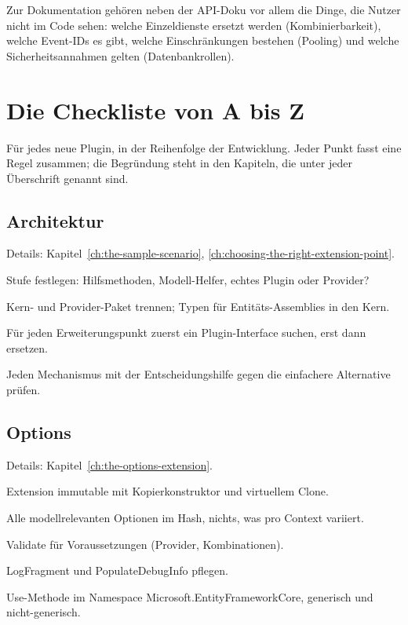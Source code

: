 Zur Dokumentation gehören neben der API-Doku vor allem die Dinge, die Nutzer nicht im Code
sehen: welche Einzeldienste ersetzt werden (Kombinierbarkeit), welche Event-IDs es gibt,
welche Einschränkungen bestehen (Pooling) und welche Sicherheitsannahmen gelten
(Datenbankrollen).

\chapter{Die Checkliste von A bis Z}\label{ch:the-checklist-from-a-to}

Für jedes neue Plugin, in der Reihenfolge der Entwicklung. Jeder Punkt fasst eine Regel zusammen; die Begründung steht in den Kapiteln, die unter jeder Überschrift genannt sind.

\section{Architektur}

\noindent Details: Kapitel~\ref{ch:the-sample-scenario}, \ref{ch:choosing-the-right-extension-point}.

\begin{checklist}
  \item Stufe festlegen: Hilfsmethoden, Modell-Helfer, echtes Plugin oder Provider?
  \item Kern- und Provider-Paket trennen; Typen für Entitäts-Assemblies in den Kern.
  \item Für jeden Erweiterungspunkt zuerst ein Plugin-Interface suchen, erst dann ersetzen.
  \item Jeden Mechanismus mit der Entscheidungshilfe gegen die einfachere Alternative
    prüfen.
\end{checklist}

\section{Options}

\noindent Details: Kapitel~\ref{ch:the-options-extension}.

\begin{checklist}
  \item Extension immutable mit Kopierkonstruktor und virtuellem Clone.
  \item Alle modellrelevanten Optionen im Hash, nichts, was pro Context variiert.
  \item Validate für Voraussetzungen (Provider, Kombinationen).
  \item LogFragment und PopulateDebugInfo pflegen.
  \item Use-Methode im Namespace Microsoft.EntityFrameworkCore, generisch und
    nicht-generisch.
\end{checklist}

